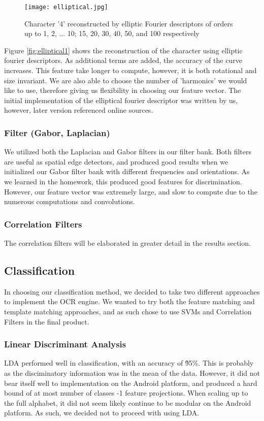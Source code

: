 \begin{figure}[h]
		\texttt{[image: elliptical.jpg]}\\
		\caption{Character '4' reconstructed by elliptic Fourier descriptors of orders up to 1, 2, ... 10; 15, 20, 30, 40,  50, and 100 respectively}
		\label{fig:elliptical}
\end{figure}
Figure \ref{fig:elliptical1} shows the reconstruction of the character using elliptic fourier descriptors. As additional terms are added, the accuracy of
the curve increases. This feature take longer to compute, however, it is both rotational and size invariant. We are also able to choose the number
of 'harmonics' we would like to use, therefore giving us flexibility in choosing our feature vector. The initial implementation of the elliptical fourier
descriptor was written by us, however, later version referenced online sources.

\subsubsection{Filter (Gabor, Laplacian)}
We utilized both the Laplacian and Gabor filters in our filter bank. Both filters are useful as spatial edge detectors, and produced
good results when we initialized our Gabor filter bank with different frequencies and orientations. As we learned in the homework, this produced
good features for discrimination. However, our feature vector was extremely large, and slow to compute due to the numerous computations and convolutions.

\subsubsection{Correlation Filters}
The correlation filters will be elaborated in greater detail in the results section.



\subsection{Classification}
In choosing our classification method, we decided to take two different approaches to implement the OCR engine. We wanted
to try both the feature matching and template matching approaches, and as such chose to use SVMs and Correlation Filters in the final product.

\subsubsection{Linear Discriminant Analysis}
LDA performed well in classification, with an accuracy of \~95\%. This is probably as the disciminatory information was in the mean of the data.
However, it did not bear itself well to implementation on the Android platform, and produced a hard bound of at most number of classes -1 feature
projections. When scaling up to the full alphabet, it did not seem likely continue to be modular on the Android platform. As such, we decided not
to proceed with using LDA.

